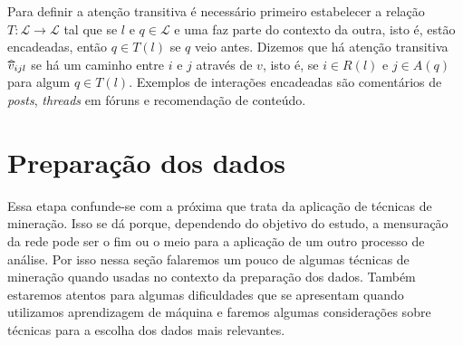 \documentclass{article}
\begin{document}
Para definir a atenção transitiva é necessário primeiro estabelecer a relação
$T:\mathscr{L}\to\mathscr{L}$ tal que se $l$ e $q \in \mathscr{L}$ e uma faz
parte do contexto da outra, isto é, estão encadeadas, então $q \in T(l)$ se $q$
veio antes. Dizemos que há atenção transitiva $\widetriangle{v}_{ijl}$ se há um
caminho entre $i$ e $j$ através de $v$, isto é, se $i \in R(l)$ e $j \in A(q)$
para algum $q \in T(l)$. Exemplos de interações encadeadas são comentários de
\textit{posts}, \textit{threads} em fóruns e recomendação de conteúdo.

\section{Preparação dos dados}

Essa etapa confunde-se com a próxima que trata da aplicação de técnicas de
mineração. Isso se dá porque, dependendo do objetivo do estudo, a mensuração da
rede pode ser o fim ou o meio para a aplicação de um outro processo de análise.
Por isso nessa seção falaremos um pouco de algumas técnicas de mineração quando
usadas no contexto da preparação dos dados. Também estaremos atentos para
algumas dificuldades que se apresentam quando utilizamos aprendizagem de
máquina e faremos algumas considerações sobre técnicas para a escolha dos dados
mais relevantes.
\end{document}
